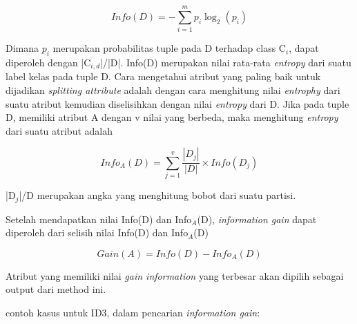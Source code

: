 
\begin{displaymath}
	Info(D) = -\sum_{i=1}^{m} p_{i} \log_2(p_{i})
\end{displaymath}

Dimana $p_{i}$ merupakan probabilitas tuple pada D terhadap class C$_{i}$, dapat diperoleh dengan |C$_{i,d}$|/|D|. Info(D) merupakan nilai rata-rata \textsl{entropy} dari suatu label kelas pada tuple D. Cara mengetahui atribut yang paling baik untuk dijadikan \textsl{splitting attribute} adalah dengan cara menghitung nilai \textsl{entrophy} dari suatu atribut kemudian diselisihkan dengan nilai \textsl{entropy} dari D. Jika pada tuple D, memiliki atribut A dengan v nilai yang berbeda, maka menghitung \textsl{entropy} dari suatu atribut adalah

\begin{displaymath}
	Info_A(D) = \sum_{j=1}^v \frac{|D_j|}{|D|} \times Info(D_j)
\end{displaymath}

|D$_{j}$|/D merupakan angka yang menghitung bobot dari suatu partisi.

Setelah mendapatkan nilai Info(D) dan Info$_{A}$(D), \textsl{information gain} dapat diperoleh dari selisih nilai Info(D) dan Info$_{A}$(D)

\begin{displaymath}
	Gain(A) = Info(D) - Info_A(D)
\end{displaymath}

Atribut yang memiliki nilai \textsl{gain information} yang terbesar akan dipilih sebagai output dari method ini.

contoh kasus untuk ID3, dalam pencarian \textsl{information gain}:

